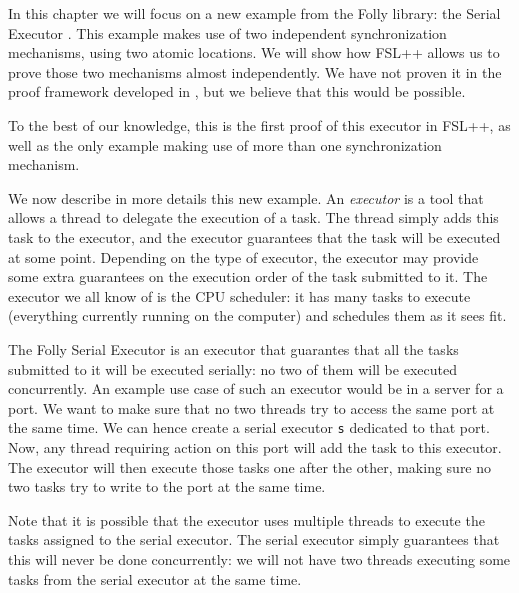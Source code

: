 \label{ch:serialExec}
In this chapter we will focus on a new example from the Folly library: the Serial Executor \cite{serialExec}. This example makes use of two independent synchronization mechanisms, using two atomic locations. We will show how FSL++ allows us to prove those two mechanisms almost independently. %
We have not proven it in the proof framework developed in \cite{pascal}, but we believe that this would be possible.

To the best of our knowledge, this is the first proof of this executor in FSL++,  as well as the only example making use of more than one synchronization mechanism.

We now describe in more details this new example. An \emph{executor} is a tool that allows a thread to delegate the execution of a task. The thread simply adds this task to the executor, and the executor guarantees that the task will be executed at some point. Depending on the type of executor, the executor may provide some extra guarantees on the execution order of the task submitted to it. The executor we all know of is the CPU scheduler: it has many tasks to execute (everything currently running on the computer) and schedules them as it sees fit.

The Folly Serial Executor is an executor that guarantes that all the tasks submitted to it will be executed serially: no two of them will be executed concurrently. %
An example use case of such an executor would be in a server for a port. We want to make sure that no two threads try to access the same port at the same time. We can hence create a serial executor \texttt{s} dedicated to that port. Now, any thread requiring action on this port will add the task to this executor. The executor will then execute those tasks one after the other, making sure no two tasks try to write to the port at the same time.

Note that it is possible that the executor uses multiple threads to execute the tasks assigned to the serial executor. The serial executor simply guarantees that this will never be done concurrently: we will not have two threads executing some tasks from the serial executor at the same time.

